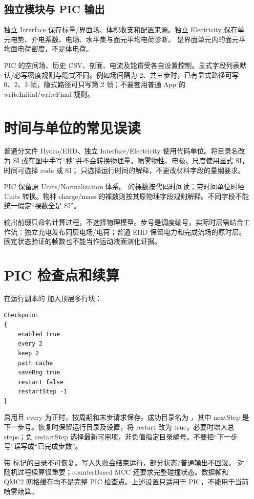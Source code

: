 \documentclass[a4paper,11pt]{article}
\begin{document}
\subsection{独立模块与 PIC 输出}
独立 Interface 保存标量/界面场、体积收支和配置来源。独立 Electricity 保存单元电势、介电系数、电场、水平集与面元平均电荷诊断。 是界面单元内的面元平均面电荷密度，不是体电荷。

PIC 的空间场、历史 CSV、剖面、电流及能谱受各自设置控制。显式字段列表默认/必写密度规则与隐式不同。例如场间隔为 2、共三步时，已有显式路径可写 0、2、3 帧，隐式路径可只写第 2 帧；不要套用普通 App 的 writeInitial/writeFinal 规则。

\section{时间与单位的常见误读}
普通分文件 Hydro/EHD、独立 Interface/Electricity 使用代码单位。将目录名改为 SI 或在图中手写“秒”并不会转换物理量。喷雾物性、电极、尺度使用显式 SI，时间可选择 code 或 SI； 只选择运行时间的解释，不更改材料字段的量纲要求。

PIC 保留原 Units/Normalization 体系。 的裸数按代码时间读；带时间单位时经 Units 转换。物种 charge/mass 的裸数则按其原物理字段规则解释。不同字段不能统一假定“裸数全是 SI”。

输出前缀只命名计算过程，不选择物理模型。步号是调度编号，实际时层需结合工作流：独立充电发布同层电场/电荷；普通 EHD 保留电力和完成流场的原时层。固定状态验证的帧数也不能当作运动液面演化证据。

\section{PIC 检查点和续算}
在运行副本的  加入顶层多行块：
\begin{lstlisting}
Checkpoint
{
    enabled true
    every 2
    keep 2
    path cache
    saveRng true
    restart false
    restartStep -1
}
\end{lstlisting}
启用且 every 为正时，按周期和末步请求保存。成功目录名为 ，其中 nextStep 是下一步号。恢复时保留运行目录及设置，将 restart 改为 true，必要时增大总 steps；负 restartStep 选择最新可用项，非负值指定目录编号。不要把“下一步号”误写成“已完成步数”。

带  标记的目录不可恢复。写入失败会结束运行，部分状态/普通输出不回滚。 对随机过程续算很重要；counterBased MCC 还要求完整碰撞状态。数据帧和 QMC2 网格缓存均不是完整 PIC 检查点。上述设置只适用于 PIC，不能用于当前喷雾续算。
\end{document}

